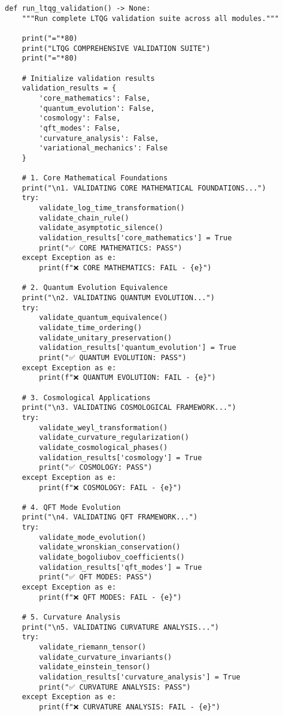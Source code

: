 \documentclass[11pt,a4paper]{article}
\theoremstyle{definition}
\theoremstyle{remark}
\begin{document}
\begin{lstlisting}
def run_ltqg_validation() -> None:
    """Run complete LTQG validation suite across all modules."""
    
    print("="*80)
    print("LTQG COMPREHENSIVE VALIDATION SUITE")
    print("="*80)
    
    # Initialize validation results
    validation_results = {
        'core_mathematics': False,
        'quantum_evolution': False,
        'cosmology': False,
        'qft_modes': False,
        'curvature_analysis': False,
        'variational_mechanics': False
    }
    
    # 1. Core Mathematical Foundations
    print("\n1. VALIDATING CORE MATHEMATICAL FOUNDATIONS...")
    try:
        validate_log_time_transformation()
        validate_chain_rule()
        validate_asymptotic_silence()
        validation_results['core_mathematics'] = True
        print("✅ CORE MATHEMATICS: PASS")
    except Exception as e:
        print(f"❌ CORE MATHEMATICS: FAIL - {e}")
    
    # 2. Quantum Evolution Equivalence
    print("\n2. VALIDATING QUANTUM EVOLUTION...")
    try:
        validate_quantum_equivalence()
        validate_time_ordering()
        validate_unitary_preservation()
        validation_results['quantum_evolution'] = True
        print("✅ QUANTUM EVOLUTION: PASS")
    except Exception as e:
        print(f"❌ QUANTUM EVOLUTION: FAIL - {e}")
    
    # 3. Cosmological Applications
    print("\n3. VALIDATING COSMOLOGICAL FRAMEWORK...")
    try:
        validate_weyl_transformation()
        validate_curvature_regularization()
        validate_cosmological_phases()
        validation_results['cosmology'] = True
        print("✅ COSMOLOGY: PASS")
    except Exception as e:
        print(f"❌ COSMOLOGY: FAIL - {e}")
    
    # 4. QFT Mode Evolution
    print("\n4. VALIDATING QFT FRAMEWORK...")
    try:
        validate_mode_evolution()
        validate_wronskian_conservation()
        validate_bogoliubov_coefficients()
        validation_results['qft_modes'] = True
        print("✅ QFT MODES: PASS")
    except Exception as e:
        print(f"❌ QFT MODES: FAIL - {e}")
    
    # 5. Curvature Analysis
    print("\n5. VALIDATING CURVATURE ANALYSIS...")
    try:
        validate_riemann_tensor()
        validate_curvature_invariants()
        validate_einstein_tensor()
        validation_results['curvature_analysis'] = True
        print("✅ CURVATURE ANALYSIS: PASS")
    except Exception as e:
        print(f"❌ CURVATURE ANALYSIS: FAIL - {e}")
    

\end{lstlisting}
\end{document}
